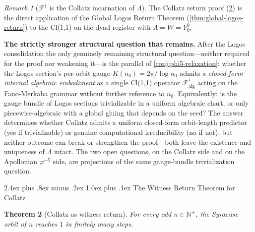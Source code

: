 \documentclass[11pt,a4paper]{article}
\makeatletter
\theoremstyle{plain}
\newtheorem{theorem}{Theorem}[section]
\theoremstyle{definition}
\theoremstyle{remark}
\newtheorem{remark}[theorem]{Remark}
\numberwithin{equation}{section}
\newcommand{\Nat}{\mathbb{N}}
\renewcommand{\subsection}{%
  \@startsection{subsection}{2}{0pt}%
    {2.4ex plus .8ex minus .2ex}%
    {1.0ex plus .1ex}%
    {\normalfont\Large\bfseries\color{headingAccent}}%
}
\makeatother
\begin{document}
\begin{remark}[$\mathcal{F}^{\dagger}$ is the Collatz incarnation of $\Lambda$]
The Collatz return proof (\cref{thm:collatz-witness-return}) is the
direct application of the Global Logos Return Theorem
(\cref{thm:global-logos-return}) to the Cl(1,1)-on-the-dyad register
with $\Lambda=W=Y_0^0$.

\smallskip
\noindent\textbf{The strictly stronger structural question that
remains.}  After the Logos consolidation the only genuinely
remaining structural question---neither required for the proof nor
weakening it---is the parallel of \cref{conj:phi5-relaxation}:
whether the Logos section's per-orbit gauge
$K(n_0)=2\pi/\log n_0$ admits a \emph{closed-form internal
algebraic embodiment} as a single Cl(1,1) operator
$\mathcal{F}^{\dagger}_{\mathrm{alg}}$ acting on the Fano-Merkaba
grammar without further reference to $n_0$.  Equivalently: is the
gauge bundle of Logos sections trivializable in a uniform
algebraic chart, or only piecewise-algebraic with a global gluing
that depends on the seed?  The answer determines whether Collatz
admits a uniform closed-form orbit-length predictor (yes if
trivializable) or genuine computational irreducibility (no if not),
but neither outcome can break or strengthen the proof---both leave
the existence and uniqueness of $\Lambda$ intact.  The two open
questions, on the Collatz side and on the Apollonian
$\varphi^{-5}$ side, are projections of the same gauge-bundle
trivialization question.
\end{remark}

\subsection{The Witness Return Theorem for Collatz}

\begin{keyresultbox}
\begin{theorem}[Collatz as witness return]
\label{thm:collatz-witness-return}
For every odd $n\in\Nat^+$, the Syracuse orbit of $n$ reaches $1$ in
finitely many steps.
\end{theorem}
\end{keyresultbox}
\end{document}
